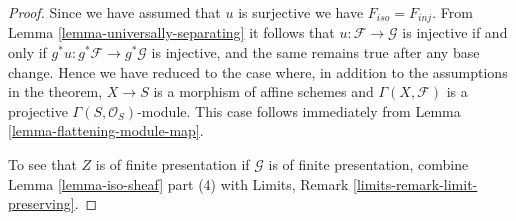 \begin{proof}
\medskip\noindent
Since we have assumed that $u$ is surjective we have $F_{iso} = F_{inj}$. From
Lemma \ref{lemma-universally-separating}
it follows that $u : \mathcal{F} \to \mathcal{G}$ is injective if and only if
$g^*u : g^*\mathcal{F} \to g^*\mathcal{G}$ is injective, and the same remains
true after any base change. Hence we have reduced to the case where,
in addition to the assumptions in the theorem, $X \to S$ is a morphism of
affine schemes and $\Gamma(X, \mathcal{F})$ is a projective
$\Gamma(S, \mathcal{O}_S)$-module. This case follows immediately from
Lemma \ref{lemma-flattening-module-map}.

\medskip\noindent
To see that $Z$ is of finite presentation if $\mathcal{G}$ is of finite
presentation, combine
Lemma \ref{lemma-iso-sheaf} part (4)
with
Limits, Remark \ref{limits-remark-limit-preserving}.
\end{proof}